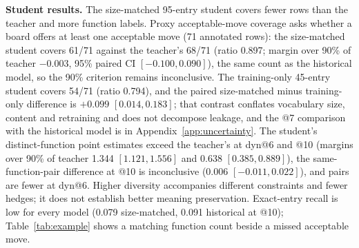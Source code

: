 \textbf{Student results.} The size-matched 95-entry student covers fewer rows than the teacher and more function labels. Proxy acceptable-move coverage asks whether a board offers at least one acceptable move (71 annotated rows): the size-matched student covers 61/71 against the teacher's 68/71 (ratio 0.897; margin over 90\% of teacher $-0.003$, 95\% paired CI $[-0.100,0.090]$), the same count as the historical model, so the 90\% criterion remains inconclusive. The training-only 45-entry student covers 54/71 (ratio 0.794), and the paired size-matched minus training-only difference is $+0.099$ $[0.014,0.183]$; that contrast conflates vocabulary size, content and retraining and does not decompose leakage, and the @7 comparison with the historical model is in Appendix~\ref{app:uncertainty}. %
The student's distinct-function point estimates exceed the teacher's at dyn@6 and @10 (margins over 90\% of teacher 1.344 $[1.121,1.556]$ and 0.638 $[0.385,0.889]$), the same-function-pair difference at @10 is inconclusive (0.006 $[-0.011,0.022]$), and pairs are fewer at dyn@6. Higher diversity accompanies different constraints and fewer hedges; it does not establish better meaning preservation. Exact-entry recall is low for every model (0.079 size-matched, 0.091 historical at @10); Table~\ref{tab:example} shows a matching function count beside a missed acceptable move. %

